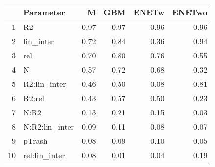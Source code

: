 \begin{table}[ht]
\centering
\begin{tabular}{rlrrrr}
  \hline
 & Parameter & M & GBM & ENETw & ENETwo \\ 
  \hline
1 & R2 & 0.97 & 0.97 & 0.96 & 0.96 \\ 
  2 & lin\_inter & 0.72 & 0.84 & 0.36 & 0.94 \\ 
  3 & rel & 0.70 & 0.80 & 0.76 & 0.55 \\ 
  4 & N & 0.57 & 0.72 & 0.68 & 0.32 \\ 
  5 & R2:lin\_inter & 0.46 & 0.50 & 0.08 & 0.81 \\ 
  6 & R2:rel & 0.43 & 0.57 & 0.50 & 0.23 \\ 
  7 & N:R2 & 0.13 & 0.21 & 0.15 & 0.03 \\ 
  8 & N:R2:lin\_inter & 0.09 & 0.11 & 0.08 & 0.07 \\ 
  9 & pTrash & 0.08 & 0.09 & 0.10 & 0.05 \\ 
  10 & rel:lin\_inter & 0.08 & 0.01 & 0.04 & 0.19 \\ 
   \hline
\end{tabular}
\end{table}
